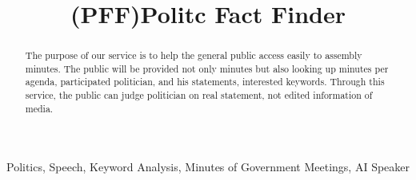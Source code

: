\documentclass[conference]{IEEEtran}
\begin{document}
\title{(PFF)Politc Fact Finder \\
}
\author{
\and
{}
\and
{}
\and
{}
}
\maketitle

\begin{abstract}
The purpose of our service is to help the general public access easily to assembly minutes. The public will be provided not only minutes but also looking up minutes per agenda, participated politician, and his statements, interested keywords. Through this service, the public can judge politician on real statement, not edited information of media.\linebreak \\
\end{abstract}

\begin{IEEEkeywords}
Politics, Speech, Keyword Analysis, Minutes of Government Meetings, AI Speaker  \linebreak \\
\end{IEEEkeywords}
\end{document}
